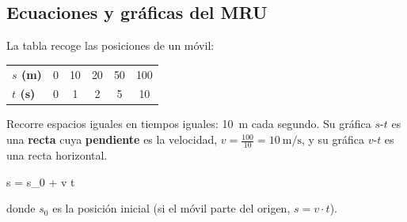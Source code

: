 \subsection{Ecuaciones y gráficas del MRU}

La tabla recoge las posiciones de un móvil:
\begin{center}
    \begin{tabular}{@{}lccccc@{}}
        \toprule
        \textbf{\(s\) (\unit{\m})} & 0 & 10 & 20 & 50 & 100 \\[3pt]
        \textbf{\(t\) (\unit{\s})} & 0 & 1 & 2 & 5 & 10 \\
        \bottomrule
    \end{tabular}
\end{center}
Recorre espacios iguales en tiempos iguales: \qty{10}{\m} cada segundo. Su gráfica \(s\)-\(t\) es una \textbf{recta} cuya \textbf{pendiente} es la velocidad, \(v = \frac{100}{10} = \qty{10}{\m\per\s}\), y su gráfica \(v\)-\(t\) es una recta horizontal.

\begin{center}
    \qquad
\end{center}

\begin{centeredequation}
    s = s_0 + v \cdot t
\end{centeredequation}
donde \(s_0\) es la posición inicial (si el móvil parte del origen, \(s = v \cdot t\)).

